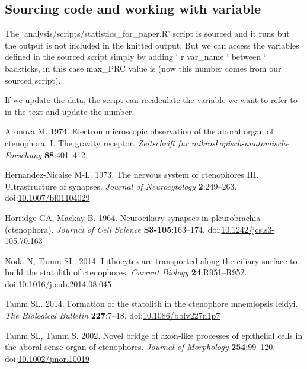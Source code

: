 \documentclass[
  11pt,
]{article}
\newlength{\cslhangindent}
\newenvironment{CSLReferences}[2] %
 {\begin{list}{}{%
  \setlength{\itemindent}{0pt}
  \setlength{\leftmargin}{0pt}
  \setlength{\parsep}{0pt}
  \ifodd #1
   \setlength{\leftmargin}{\cslhangindent}
   \setlength{\itemindent}{-1\cslhangindent}
  \fi
  \setlength{\itemsep}{#2\baselineskip}}}
 {\end{list}}
\begin{document}
\subsection{Sourcing code and working with
variable}\label{sourcing-code-and-working-with-variable}

The `analysis/scripts/statistics\_for\_paper.R' script is sourced and it
runs but the output is not included in the knitted output. But we can
access the variables defined in the sourced script simply by adding ` r
var\_name ` between ` backticks, in this case max\_PRC value is (now
this number comes from our sourced script).

If we update the data, the script can recalculate the variable we want
to refer to in the text and update the number.

\label{refs}
\begin{CSLReferences}{1}{0}
Aronova M. 1974. Electron microscopic observation of the aboral organ of
ctenophora. I. The gravity receptor. \emph{Zeitschrift fur
mikroskopisch-anatomische Forschung} \textbf{88}:401--412.

Hernandez-Nicaise M-L. 1973. The nervous system of ctenophores III.
Ultrastructure of synapses. \emph{Journal of Neurocytology}
\textbf{2}:249--263.
doi:\href{https://doi.org/10.1007/bf01104029}{10.1007/bf01104029}

Horridge GA, Mackay B. 1964. Neurociliary synapses in pleurobrachia
(ctenophora). \emph{Journal of Cell Science} \textbf{S3-105}:163--174.
doi:\href{https://doi.org/10.1242/jcs.s3-105.70.163}{10.1242/jcs.s3-105.70.163}

Noda N, Tamm SL. 2014. Lithocytes are transported along the ciliary
surface to build the statolith of ctenophores. \emph{Current Biology}
\textbf{24}:R951--R952.
doi:\href{https://doi.org/10.1016/j.cub.2014.08.045}{10.1016/j.cub.2014.08.045}

Tamm SL. 2014. Formation of the statolith in the ctenophore mnemiopsis
leidyi. \emph{The Biological Bulletin} \textbf{227}:7--18.
doi:\href{https://doi.org/10.1086/bblv227n1p7}{10.1086/bblv227n1p7}

Tamm SL, Tamm S. 2002. Novel bridge of axon‐like processes of epithelial
cells in the aboral sense organ of ctenophores. \emph{Journal of
Morphology} \textbf{254}:99--120.
doi:\href{https://doi.org/10.1002/jmor.10019}{10.1002/jmor.10019}

\end{CSLReferences}
\end{document}
